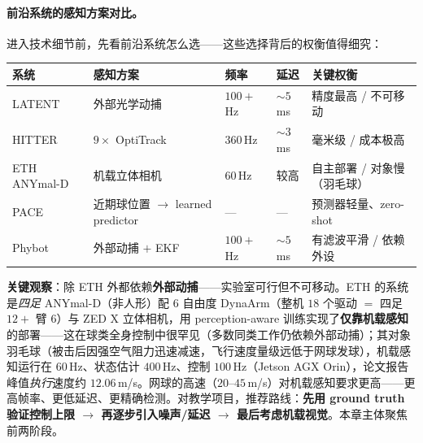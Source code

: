 \paragraph{前沿系统的感知方案对比。}进入技术细节前，先看前沿系统怎么选——这些选择背后的权衡值得细究：

\begin{center}
\small
\begin{tabular}{@{}lllll@{}}
\toprule
系统 & 感知方案 & 频率 & 延迟 & 关键权衡 \\
\midrule
LATENT\cite{tennis_latent2026} & 外部光学动捕 & $100+$\,Hz & $\sim5$\,ms & 精度最高 / 不可移动 \\
HITTER\cite{tennis_hitter2025} & $9\times$ OptiTrack & $360$\,Hz & $\sim3$\,ms & 毫米级 / 成本极高 \\
ETH ANYmal-D\cite{tennis_eth2025badminton} & 机载立体相机 & $60$\,Hz & 较高 & 自主部署 / 对象慢（羽毛球） \\
PACE\cite{tennis_pace2025} & 近期球位置 $\to$ learned predictor & — & — & 预测器轻量、zero-shot \\
Phybot\cite{tennis_phybot2025} & 外部动捕 $+$ EKF & $100+$\,Hz & $\sim5$\,ms & 有滤波平滑 / 依赖外设 \\
\bottomrule
\end{tabular}
\end{center}


\textbf{关键观察}：除 ETH 外都依赖\textbf{外部动捕}——实验室可行但不可移动。ETH 的系统是\emph{四足} ANYmal-D（非人形）配 $6$ 自由度 DynaArm（整机 $18$ 个驱动 $=$ 四足 $12+$ 臂 $6$）与 ZED X 立体相机，用 perception-aware 训练实现了\textbf{仅靠机载感知}的部署——这在球类全身控制中很罕见（多数同类工作仍依赖外部动捕）；其对象羽毛球（被击后因强空气阻力迅速减速，飞行速度量级远低于网球发球），机载感知运行在 $60$\,Hz、状态估计 $400$\,Hz、控制 $100$\,Hz（Jetson AGX Orin），论文报告峰值\emph{执行}速度约 $12.06$\,m/s。网球的高速（$20$--$45$\,m/s）对机载感知要求更高——更高帧率、更低延迟、更精确检测。对教学项目，推荐路线：\textbf{先用 ground truth 验证控制上限 $\to$ 再逐步引入噪声/延迟 $\to$ 最后考虑机载视觉}。本章主体聚焦前两阶段。

